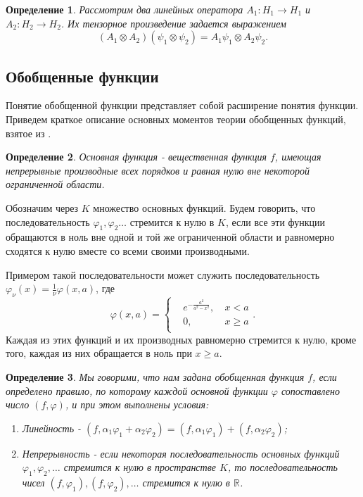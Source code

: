 \documentclass[11pt]{article}
\newtheorem{definition}{Определение}[section]
\begin{document}
\begin{definition}
Рассмотрим два линейных оператора $A_1: H_1\to H_1$ и $A_2: H_2\to H_2$. Их тензорное произведение задается выражением
\[
(A_1\otimes A_2)(\psi_1\otimes \psi_2) = A_1\psi_1 \otimes A_2\psi_2.
\]
\end{definition}


\subsection{Обобщенные функции}
Понятие обобщенной функции представляет собой расширение понятия функции. Приведем краткое описание основных моментов теории обобщенных функций, взятое из \cite{gelfand}.

\begin{definition}
Основная функция - вещественная функция $f$, имеющая непрерывные производные всех порядков и равная нулю вне некоторой ограниченной области.
\end{definition}
Обозначим через $K$ множество основных функций. Будем говорить, что последовательность $\varphi_1,\varphi_2\ldots$ стремится к нулю в $K$, если все эти функции обращаются в ноль вне одной и той же ограниченной области и равномерно сходятся к нулю вместе со всеми своими производными.

Примером такой последовательности может служить последовательность $\varphi_\nu(x) = \frac{1}{\nu}\varphi(x, a)$, где 
\[
\varphi(x, a) = \left\{
\begin{aligned}
&e^{-\frac{a^2}{a^2 - x^2}},&\ x<a\\
&0,&\ x \geq a\\
\end{aligned} \right. .
\]
Каждая из этих функций и их производных равномерно стремится к нулю, кроме того, каждая из них обращается в ноль при $x \geq a$.

\begin{definition}
Мы говорими, что нам задана обобщенная функция $f$, если определено правило, по которому каждой основной функции $\varphi$ сопоставлено число $(f, \varphi)$, и при этом выполнены условия:
\begin{enumerate}
\item Линейность - $(f, \alpha_1\varphi_1 + \alpha_2\varphi_2) = (f, \alpha_1\varphi_1) + (f, \alpha_2\varphi_2)$;
\item Непрерывность - если некоторая последовательность основных функций $\varphi_1,\varphi_2,\ldots$ стремится к нулю в пространстве $K$, то последовательность чисел $(f, \varphi_1), (f, \varphi_2), \ldots$ стремится к нулю в $\mathbb{R}$.
\end{enumerate}
\end{definition}
\end{document}
